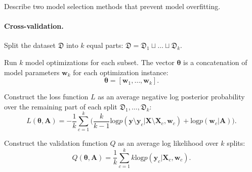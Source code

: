 \documentclass[smallcondensed]{svjour3}
\begin{document}
Describe two model selection methods that prevent model overfitting.

\paragraph{Cross-validation.}
Split the dataset  $\mathfrak{D}$ into $k$ equal parts:
$
\mathfrak{D} = \mathfrak{D}_1 \sqcup \dots \sqcup \mathfrak{D}_k.
$


Run $k$ model optimizations for each subset. The vector $\boldsymbol{\theta}$ is a concatenation of model parameters $\mathbf{w}_k$ for each optimization instance:
\[
\boldsymbol{\theta} = [\mathbf{w}_1, \dots, \mathbf{w}_k].
\]
 
Construct the loss function $L$ as an average negative log posterior probability over the remaining part of each split $\mathfrak{D}_1, \dots, \mathfrak{D}_k$:  
\begin{equation}
\label{eq:cv}
L(\boldsymbol{\theta}, \mathbf{A}) = -\frac{1}{k}\sum_{c=1}^k \bigl(\frac{k}{k-1}\text{log}p(\mathbf{y} \setminus \mathbf{y}_c|\mathbf{X}\setminus \mathbf{X}_c, \mathbf{w}_c) + \text{log}p(\mathbf{w}_c|\mathbf{A})\bigr).
\end{equation}

Construct the validation function $Q$ as an average log likelihood over $k$ splits:
\[
Q(\boldsymbol{\theta}, \mathbf{A}) = \frac{1}{k}\sum_{c=1}^k k\text{log}p(\mathbf{y}_c|\mathbf{X}_c, \mathbf{w}_c).
\]
\end{document}
